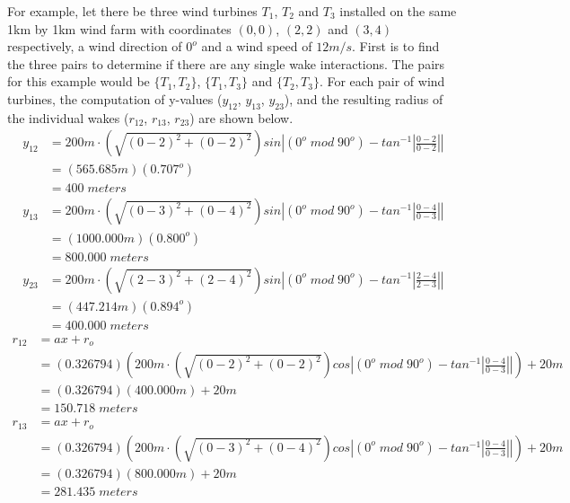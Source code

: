     For example, let there be three wind turbines $T_1$, $T_2$ and $T_3$ installed on the same 1km by 1km wind farm with coordinates $(0,0)$, $(2,2)$ and $(3,4)$ respectively, a wind direction of $0^o$ and a wind speed of $12m/s$. First is to find the three pairs to determine if there are any single wake interactions. The pairs for this example would be $\{T_1,T_2\}$, $\{T_1,T_3\}$ and $\{T_2,T_3\}$. For each pair of wind turbines, the computation of  y-values ($y_{12}$, $y_{13}$, $y_{23}$), and the resulting radius of the individual wakes ($r_{12}$, $r_{13}$, $r_{23}$) are shown below.
    \begin{align*}
        y_{12}
        &=200m\cdot \left( \sqrt{(0-2)^2+(0-2)^2} \right)sin \left| (0^o\;mod\;90^o) - tan^{-1}\left|\frac{0-2}{0-2}\right| \right| \\
        &=\left( 565.685m \right)(0.707^o) \\
        &= 400\;meters
    \end{align*}
    \begin{align*}
        y_{13}
        &=200m\cdot \left( \sqrt{(0-3)^2+(0-4)^2} \right)sin \left| (0^o\;mod\;90^o) - tan^{-1}\left|\frac{0-4}{0-3}\right| \right| \\
        &=\left( 1000.000m \right)(0.800^o) \\
        &= 800.000\;meters
    \end{align*}
    \begin{align*}
        y_{23}
        &=200m\cdot \left( \sqrt{(2-3)^2+(2-4)^2} \right)sin \left| (0^o\;mod\;90^o) - tan^{-1}\left|\frac{2-4}{2-3}\right| \right| \\
        &=\left( 447.214m \right)(0.894^o) \\
        &= 400.000\;meters
    \end{align*}
    \begin{align*}
        r_{12}
        &= ax+r_o \\
        &= (0.326794)\left( 200m\cdot \left( \sqrt{(0-2)^2+(0-2)^2} \right)cos \left| (0^o\;mod\;90^o) - tan^{-1}\left|\frac{0-4}{0-3}\right| \right| \right) + 20m \\
        &=(0.326794)(400.000m)+20m \\
        &= 150.718\;meters
    \end{align*}
    \begin{align*}
        r_{13}
        &= ax+r_o \\
        &= (0.326794)\left( 200m\cdot \left( \sqrt{(0-3)^2+(0-4)^2} \right)cos \left| (0^o\;mod\;90^o) - tan^{-1}\left|\frac{0-4}{0-3}\right| \right| \right) + 20m \\
        &=(0.326794)(800.000m)+20m \\
        &= 281.435\;meters
    \end{align*}
